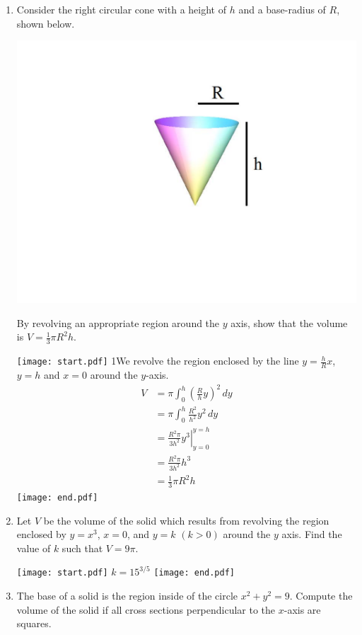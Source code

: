 \documentclass[12pt]{article}
\begin{document}
\begin{enumerate}
\item Consider the right circular cone with a height of $h$ and a base-radius of $R$, shown below.
\begin{center}
\includegraphics[scale=0.5]{cone.pdf}
\end{center}
By revolving an appropriate region around the $y$ axis, show that the volume is $V=\frac{1}{3}\pi R^2h$.

\texttt{[image: start.pdf]}
{{{1\linewidth}{We revolve the region enclosed by the line $y=\frac{h}{R}x$, $y=h$ and $x=0$ around the $y$-axis.
\begin{align*}
V&=\pi\int_0^h \left(\frac{R}{h}y\right)^2 \,dy\\
&=\pi\int_0^h \frac{R^2}{h^2}y^2 \,dy\\
&=\left.\frac{R^2\pi}{3h^2}y^3\right|_{y=0}^{y=h}\\
&=\frac{R^2\pi}{3h^2}h^3\\
&=\frac{1}{3}\pi R^2h
\end{align*}
}}}
\texttt{[image: end.pdf]}


\item Let $V$ be the volume of the solid which results from revolving the region enclosed by $y=x^3$, $x=0$, and $y=k$ $(k>0)$ around the $y$ axis.  Find the value of $k$ such that $V=9\pi$.

\texttt{[image: start.pdf]}
{{$k=15^{3/5}$}}
\texttt{[image: end.pdf]}


\item The base of a solid is the region inside of the circle $x^2+y^2=9$.  Compute the volume of the solid if all cross sections perpendicular to the $x$-axis are squares.


\end{enumerate}
\end{document}
